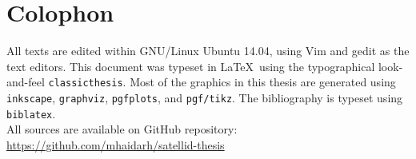 \section*{Colophon}
\label{sec:colophon}

All texts are edited within GNU/Linux Ubuntu 14.04, using Vim and gedit as the text editors.
This document was typeset in \LaTeX~using the typographical look-and-feel \texttt{classicthesis}.
Most of the graphics in this thesis are generated using \texttt{inkscape}, \texttt{graphviz}, \texttt{pgfplots}, and \texttt{pgf/tikz}.
The bibliography is typeset using \texttt{biblatex}.
\\
All sources are available on GitHub repository:\\
\url{https://github.com/mhaidarh/satellid-thesis}


